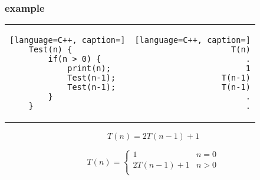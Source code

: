 \documentclass[12pt]{article}
\begin{document}
\subsubsection{example}





\begin{center}
  \bgroup
  \def\arraystretch{1.5}%
  \begin{tabular}{ E  D  }
	\begin{lstlisting}[language=C++, caption=]
	Test(n) {
		if(n > 0) {
			print(n);
			Test(n-1);
			Test(n-1);
		}
	}
	\end{lstlisting}
     &  
	\begin{lstlisting}[language=C++, caption=]
	T(n)
	.
	1
	T(n-1)
	T(n-1)
	.
	.
	\end{lstlisting}
  \end{tabular}
  \egroup
\end{center}



$$
T(n) = 2T(n-1) + 1
$$



$$
T(n) = 
\begin{cases}
1  &n = 0 \\
2T(n-1) + 1  &n > 0 \\
\end{cases}
$$
\end{document}
